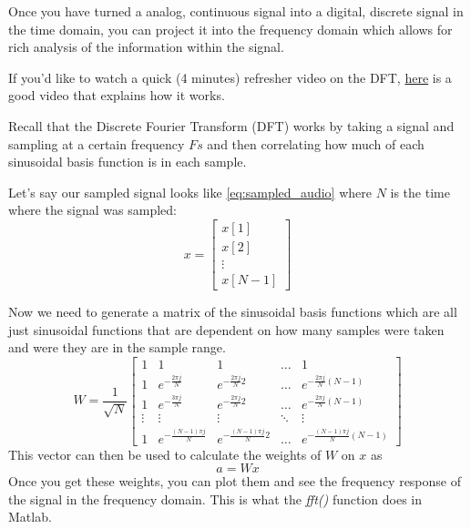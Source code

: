 \documentclass{tufte-handout}
\begin{document}
Once you have turned a analog, continuous signal into a digital, discrete signal in the time domain, you can project it into the frequency domain which allows for rich analysis of the information within the signal. 

If you'd like to watch a quick (4 minutes) refresher video on the DFT, \href{https://www.youtube.com/watch?v=h6QJLx22zrE}{here} is a good video that explains how it works.

Recall that the Discrete Fourier Transform (DFT) works by taking a signal and sampling at a certain frequency $Fs$ and then correlating how much of each sinusoidal basis function is in each sample. 

Let's say our sampled signal looks like \ref{eq:sampled_audio} where $N$ is the time where the signal was sampled:
\begin{equation}\label{eq:sampled_audio}
    x=
\begin{bmatrix}
    x[1]       \\
    x[2]       \\
    \vdots \\
    x[N-1]
\end{bmatrix}
\end{equation}

Now we need to generate a matrix of the sinusoidal basis functions which are all just sinusoidal functions that are dependent on how many samples were taken and were they are in the sample range.
\begin{equation}\label{eq:basis_fns}
    W=\dfrac{1}{\sqrt{N}}
\begin{bmatrix}
    1 & 1 & 1 & \dots  & 1 \\
    1 & e^{-\frac{2 \pi j}{N}} & e^{-\frac{2 \pi j}{N}2} & \dots  & e^{-\frac{2 \pi j}{N}(N-1)} \\
    1 & e^{-\frac{3 \pi j}{N}} & e^{-\frac{2 \pi j}{N}2} & \dots  & e^{-\frac{2 \pi j}{N}(N-1)} \\
    \vdots & \vdots & \vdots & \ddots & \vdots \\
    1 & e^{-\frac{(N-1) \pi j}{N}} & e^{-\frac{(N-1) \pi j}{N}2} & \dots  & e^{-\frac{(N-1) \pi j}{N}(N-1)}
\end{bmatrix}
\end{equation}
This vector can then be used to calculate the weights of $W$ on $x$ as
\begin{equation}
a = W x
\end{equation}
Once you get these weights, you can plot them and see the frequency response of the signal in the frequency domain. This is what the \textit{fft()} function does in Matlab.
\end{document}
